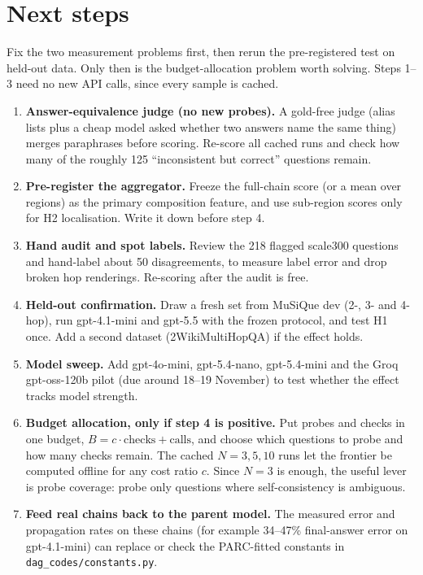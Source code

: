 \documentclass[11pt]{article}
\newcommand{\code}[1]{\texttt{#1}}
\begin{document}
\section{Next steps}

Fix the two measurement problems first, then rerun the pre-registered test on held-out
data. Only then is the budget-allocation problem worth solving. Steps 1--3 need no new API
calls, since every sample is cached.
\begin{enumerate}
  \item \textbf{Answer-equivalence judge (no new probes).} A gold-free judge (alias lists
        plus a cheap model asked whether two answers name the same thing) merges paraphrases
        before scoring. Re-score all cached runs and check how many of the roughly 125
        ``inconsistent but correct'' questions remain.
  \item \textbf{Pre-register the aggregator.} Freeze the full-chain score (or a mean over
        regions) as the primary composition feature, and use sub-region scores only for H2
        localisation. Write it down before step 4.
  \item \textbf{Hand audit and spot labels.} Review the 218 flagged scale300 questions and
        hand-label about 50 disagreements, to measure label error and drop broken hop
        renderings. Re-scoring after the audit is free.
  \item \textbf{Held-out confirmation.} Draw a fresh set from MuSiQue dev (2-, 3- and 4-hop),
        run gpt-4.1-mini and gpt-5.5 with the frozen protocol, and test H1 once. Add a second
        dataset (2WikiMultiHopQA) if the effect holds.
  \item \textbf{Model sweep.} Add gpt-4o-mini, gpt-5.4-nano, gpt-5.4-mini and the Groq
        gpt-oss-120b pilot (due around 18--19 November) to test whether the effect tracks
        model strength.
  \item \textbf{Budget allocation, only if step 4 is positive.} Put probes and checks in one
        budget, $B = c \cdot \text{checks} + \text{calls}$, and choose which questions to
        probe and how many checks remain. The cached $N = 3, 5, 10$ runs let the frontier be
        computed offline for any cost ratio $c$. Since $N = 3$ is enough, the useful lever
        is probe coverage: probe only questions where self-consistency is ambiguous.
  \item \textbf{Feed real chains back to the parent model.} The measured error and
        propagation rates on these chains (for example 34--47\% final-answer error on
        gpt-4.1-mini) can replace or check the PARC-fitted constants in
        \code{dag\_codes/constants.py}.
\end{enumerate}
\end{document}
